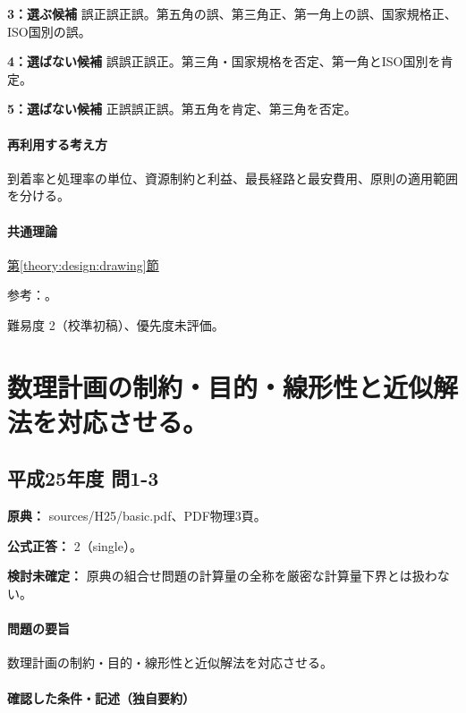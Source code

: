 \noindent\textbf{3：選ぶ候補} 誤正誤正誤。第五角の誤、第三角正、第一角上の誤、国家規格正、ISO国別の誤。\par

\noindent\textbf{4：選ばない候補} 誤誤正誤正。第三角・国家規格を否定、第一角とISO国別を肯定。\par

\noindent\textbf{5：選ばない候補} 正誤誤正誤。第五角を肯定、第三角を否定。\par

\paragraph{再利用する考え方} 到着率と処理率の単位、資源制約と利益、最長経路と最安費用、原則の適用範囲を分ける。

\paragraph{共通理論} \hyperref[theory:design:drawing]{第\ref*{theory:design:drawing}節}

\par 参考：\cite{design48_iso}。

\par 難易度 2（校準初稿）、優先度未評価。

\section{数理計画の制約・目的・線形性と近似解法を対応させる。}

\subsection{平成25年度 問1-3}
\label{q:h25-reg-basic-1-3}

\noindent\textbf{原典：} sources/H25/basic.pdf、PDF物理3頁。

\textbf{公式正答：} 2（single）。

\par\textbf{検討未確定：} 原典の組合せ問題の計算量の全称を厳密な計算量下界とは扱わない。

\paragraph{問題の要旨} 数理計画の制約・目的・線形性と近似解法を対応させる。

\paragraph{確認した条件・記述（独自要約）}\mbox{}\par

